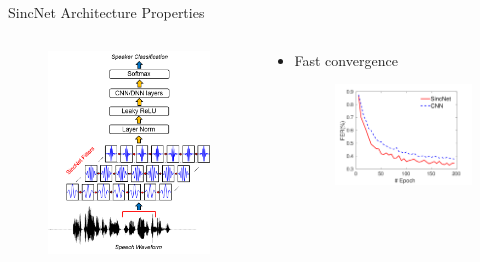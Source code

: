 \documentclass[11pt]{beamer}
\begin{document}
\begin{frame}{SincNet Architecture Properties}
	\begin{columns}
		\begin{column}{0.47\textwidth}
			\begin{figure}[H]
				\includegraphics[width=0.9\linewidth]{images/SincNet.png}
			\end{figure}
		\end{column}
		\begin{column}{0.5\textwidth}
			\begin{itemize}
				\item Fast convergence
				\begin{figure}[H]
					\includegraphics[width=0.9\linewidth]{images/fast_convergence.png}
				\end{figure}
			\end{itemize}
		\end{column}
	\end{columns}
\end{frame}
\end{document}
